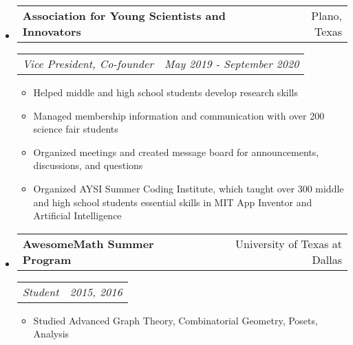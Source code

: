 \documentclass[letterpaper,11pt]{article}
\makeatletter
\newcommand{\resitem}[1]{\item #1 \vspace{-3pt}}
\newcommand{\ressubheading}[4]{
	\begin{tabular*}{7.0in}{l@{\extracolsep{\fill}}r}
			#1 & #2 \\
	\end{tabular*}
	\begin{tabular*}{7.0in}{l@{\extracolsep{\fill}}r}
			\textit{#3} & \textit{#4} \\
	\end{tabular*}\vspace{-6pt}}
\makeatother
\begin{document}
\begin{itemize}
\item
	\ressubheading{\textbf{Association for Young Scientists and Innovators}}{Plano, Texas}{Vice President, Co-founder}{May 2019 - September 2020}
		\begin{itemize}
			\resitem{Helped middle and high school students develop research skills}
			\resitem{Managed membership information and communication with over 200 science fair students}
			\resitem{Organized meetings and created message board for announcements, discussions, and questions}
			\resitem{Organized AYSI Summer Coding Institute, which taught over 300 middle and high school students essential skills in MIT App Inventor and Artificial Intelligence}
		\end{itemize}


\item
	\ressubheading{\textbf{AwesomeMath Summer Program}}{University of Texas at Dallas}{Student}{2015, 2016}
		\begin{itemize}
			\resitem{Studied Advanced Graph Theory, Combinatorial Geometry, Posets, Analysis}
		\end{itemize}




\end{itemize}
\end{document}
